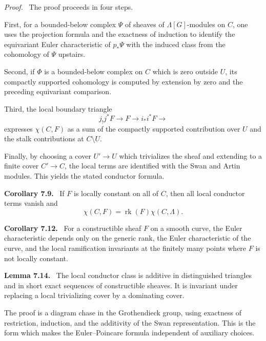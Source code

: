 \documentclass[14pt]{extarticle}
\newenvironment{statement}[1]{\par\medskip\noindent\textbf{#1.}\ }{\par\medskip}
\newenvironment{prooftext}[1][Proof]{\par\noindent\emph{#1.}\ }{\par\medskip}
\begin{document}
\begin{prooftext}
The proof proceeds in four steps.

First, for a bounded-below complex $\Psi$ of sheaves of $\Lambda[G]$-modules on $C$, one uses the projection formula and the exactness of induction to identify the equivariant Euler characteristic of $p_*\Psi$ with the induced class from the cohomology of $\Psi$ upstairs.

Second, if $\Phi$ is a bounded-below complex on $C$ which is zero outside $U$, its compactly supported cohomology is computed by extension by zero and the preceding equivariant comparison.

Third, the local boundary triangle
\[
   j_!j^*F\to F\to i_*i^*F\to
\]
expresses $\chi(C,F)$ as a sum of the compactly supported contribution over $U$ and the stalk contributions at $C\setminus U$.

Finally, by choosing a cover $U'\to U$ which trivializes the sheaf and extending to a finite cover $C'\to C$, the local terms are identified with the Swan and Artin modules. This yields the stated conductor formula.
\end{prooftext}

\begin{statement}{Corollary 7.9}
If $F$ is locally constant on all of $C$, then all local conductor terms vanish and
\[
   \chi(C,F)=\operatorname{rk}(F)\chi(C,\Lambda).
\]
\end{statement}

\begin{statement}{Corollary 7.12}
For a constructible sheaf $F$ on a smooth curve, the Euler characteristic depends only on the generic rank, the Euler characteristic of the curve, and the local ramification invariants at the finitely many points where $F$ is not locally constant.
\end{statement}

\begin{statement}{Lemma 7.14}
The local conductor class is additive in distinguished triangles and in short exact sequences of constructible sheaves. It is invariant under replacing a local trivializing cover by a dominating cover.
\end{statement}

The proof is a diagram chase in the Grothendieck group, using exactness of restriction, induction, and the additivity of the Swan representation. This is the form which makes the Euler--Poincare formula independent of auxiliary choices.
\end{document}
